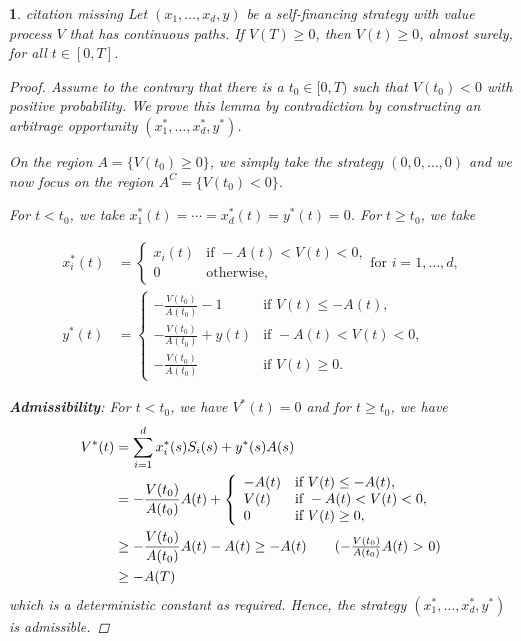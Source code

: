 \documentclass[english]{article}
\newcommand{\comment}[1]{\color{blue}#1\color{black}}
\numberwithin{equation}{section}
\numberwithin{figure}{section}
\theoremstyle{bolddescit}
\theoremstyle{definition}
\theoremstyle{definition}
\theoremstyle{plain}
\newtheorem{lemma}[theorem]{\protect\lemmaname}
\theoremstyle{plain}
\theoremstyle{bolddesc}
\theoremstyle{plain}
\theoremstyle{remark}
\providecommand{\lemmaname}{Lemma}
\begin{document}
\begin{lemma}\label{lem:bs-non-negative-strat}%
\comment{citation missing}
  Let $(x_1, \ldots, x_d, y)$ be a self-financing strategy with value process $V$ that has continuous paths. If $V(T) \ge 0$, then $V(t) \ge 0$, almost surely, for all $t \in [0,T]$.

  \begin{proof}
    Assume to the contrary that there is a $t_0 \in [0,T)$ such that $V(t_0) < 0$ with positive probability. We prove this lemma by contradiction by constructing an arbitrage opportunity $(x_1^*, \ldots, x_d^*, y^*)$.

    On the region $A = \{V(t_0) \ge 0\}$, we simply take the strategy $(0,0,\ldots,0)$ and we now focus on the region $A^C = \{V(t_0) < 0\}$.

    For $t < t_0$, we take $x_1^*(t) = \cdots = x_d^*(t) = y^*(t) = 0$. For $t \ge t_0$, we take

    \begin{align*}
      x_i^*(t) &= \left\{ \begin{array}{ll}
        x_i(t) & \text{if } -A(t) < V(t) < 0,\\
        0 & \text{otherwise},
      \end{array}\right. \text{for } i=1,\ldots,d,\\
      y^*(t) &= \left\{ \begin{array}{ll}
        - \frac{V(t_0)}{A(t_0)} - 1 & \text{if } V(t) \le - A(t),\\
        - \frac{V(t_0)}{A(t_0)} + y(t) & \text{if } -A(t) < V(t) < 0,\\
        - \frac{V(t_0)}{A(t_0)} & \text{if } V(t) \ge 0.
      \end{array}\right.
    \end{align*}

    \textbf{Admissibility}: For $t < t_0$, we have $V^*(t) = 0$ and for $t \ge t_0$, we have
      \begin{align*}
        V^*(t)
        &= \sum_{i=1}^d x_i^*(s) S_i(s) + y^*(s) A(s)\\
        &= -\frac{V(t_0)}{A(t_0)} A(t) + \left\{
          \begin{array}{ll}
            -A(t) & \text{if } V(t) \le -A(t),\\
            V(t) & \text{if } -A(t) < V(t) < 0,\\
            0 & \text{if } V(t) \ge 0,
          \end{array}
        \right.\\
        &\ge -\frac{V(t_0)}{A(t_0)} A(t) - A(t)
        \ge - A(t) \tag{$-\frac{V(t_0)}{A(t_0)}A(t)$ > 0}\\
        &\ge -  A(T)
      \end{align*}
      which is a deterministic constant as required. Hence, the strategy $(x^*_1,\ldots,x^*_d,y^*)$ is admissible.


\end{proof}
\end{lemma}
\end{document}
